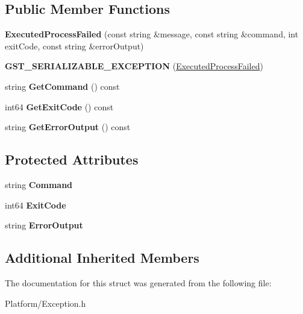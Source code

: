 \subsection*{Public Member Functions}
\begin{DoxyCompactItemize}
\item 
\mbox{\label{struct_gost_crypt_1_1_executed_process_failed_a24f8f3b8399bcb263cd6546fb795ee0d}} 
{\bfseries Executed\+Process\+Failed} (const string \&message, const string \&command, int exit\+Code, const string \&error\+Output)
\item 
\mbox{\label{struct_gost_crypt_1_1_executed_process_failed_af26474ab6a0d5527832e798359350015}} 
{\bfseries G\+S\+T\+\_\+\+S\+E\+R\+I\+A\+L\+I\+Z\+A\+B\+L\+E\+\_\+\+E\+X\+C\+E\+P\+T\+I\+ON} (\hyperlink{struct_gost_crypt_1_1_executed_process_failed}{Executed\+Process\+Failed})
\item 
\mbox{\label{struct_gost_crypt_1_1_executed_process_failed_a820168a83a46c8e5c918d5284479fedf}} 
string {\bfseries Get\+Command} () const
\item 
\mbox{\label{struct_gost_crypt_1_1_executed_process_failed_ad45dc3d96871a22f1c17db78ea425a1f}} 
int64 {\bfseries Get\+Exit\+Code} () const
\item 
\mbox{\label{struct_gost_crypt_1_1_executed_process_failed_a4b4c902d68c13bc95f1a7c4d0c9447b3}} 
string {\bfseries Get\+Error\+Output} () const
\end{DoxyCompactItemize}
\subsection*{Protected Attributes}
\begin{DoxyCompactItemize}
\item 
\mbox{\label{struct_gost_crypt_1_1_executed_process_failed_a9206d298e34a6583af725dff89d26945}} 
string {\bfseries Command}
\item 
\mbox{\label{struct_gost_crypt_1_1_executed_process_failed_a545488b83cc5578f6d20cdd076efef84}} 
int64 {\bfseries Exit\+Code}
\item 
\mbox{\label{struct_gost_crypt_1_1_executed_process_failed_a8574ba8ad8b504bcf035f1a1cd930fd3}} 
string {\bfseries Error\+Output}
\end{DoxyCompactItemize}
\subsection*{Additional Inherited Members}


The documentation for this struct was generated from the following file\+:\begin{DoxyCompactItemize}
\item 
Platform/Exception.\+h\end{DoxyCompactItemize}

